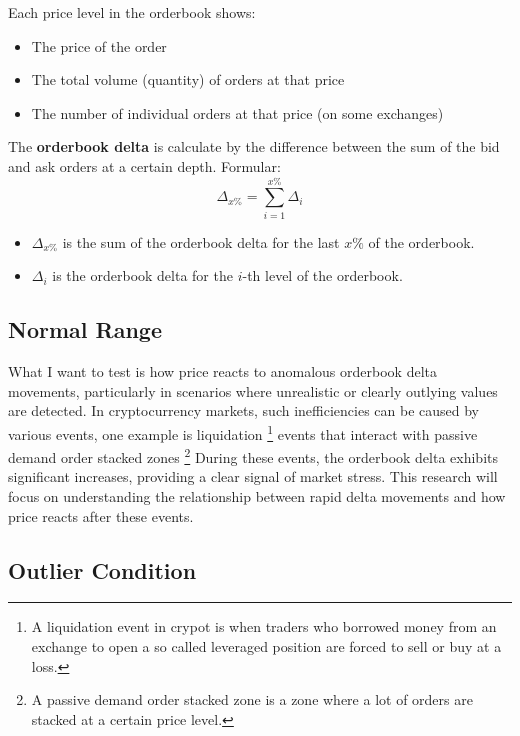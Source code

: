 \documentclass[12pt]{article}
\begin{document}
Each price level in the orderbook shows:
\begin{itemize}
  \item The price of the order
  \item The total volume (quantity) of orders at that price
  \item The number of individual orders at that price (on some exchanges)
\end{itemize}

The \textbf{orderbook delta} is calculate by the difference between the sum of the bid and ask orders at a certain depth.
Formular:
\begin{equation*}
  \Delta_{x\%} = \sum_{i=1}^{x\%} \Delta_{i}
  \label{eq:orderbook_delta_x}
\end{equation*}

\begin{itemize}
  \item $\Delta_{x\%}$ is the sum of the orderbook delta for the last $x\%$ of the orderbook.
  \item $\Delta_{i}$ is the orderbook delta for the $i$-th level of the orderbook.
\end{itemize}



\subsection{Normal Range}

What I want to test is how price reacts to anomalous orderbook delta movements, particularly in scenarios where unrealistic or clearly outlying values are detected. In cryptocurrency markets, such inefficiencies can be caused by various events, one example is liquidation \footnote[1]{A liquidation event in crypot is when traders who borrowed money from an exchange to open a so called leveraged position are forced to sell or buy at a loss.}
 events that interact with passive demand order stacked zones \footnote[2]{A passive demand order stacked zone is a zone where a lot of orders are stacked at a certain price level.} During these events, the orderbook delta exhibits significant increases, providing a clear signal of market stress. This research will focus on understanding the relationship between rapid delta movements and how price reacts after these events. 
\newpage


\subsection{Outlier Condition}
\end{document}
